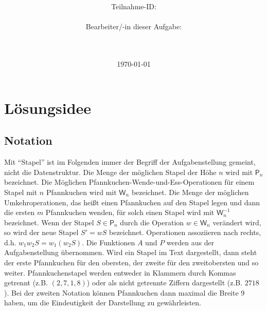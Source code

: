 \documentclass[a4paper,10pt,ngerman]{scrartcl}
\title{\textbf{\Huge\Aufgabe}}
\author{\LARGE Teilnahme-ID: \LARGE \TeilnahmeId \\\\
  \LARGE Bearbeiter/-in dieser Aufgabe: \\
  \LARGE \Name\\\\}
\date{\LARGE\today}
\begin{document}
\maketitle
\tableofcontents

\vspace{0.5cm}

\section{Lösungsidee}
\subsection{Notation}
Mit ``Stapel'' ist im Folgenden immer der Begriff der Aufgabenstellung gemeint,
nicht die Datenstruktur. Die Menge der möglichen Stapel der Höhe $n$ wird mit
$\mathsf{P}_n$ bezeichnet. Die Möglichen Pfannkuchen-Wende-und-Ess-Operationen
für einem Stapel mit $n$ Pfannkuchen wird mit $\mathsf{W}_n$ bezeichnet. Die
Menge der möglichen Umkehroperationen, das heißt einen Pfannkuchen auf den
Stapel legen und dann die ersten $m$ Pfannkuchen wenden, für solch einen Stapel
wird mit $\mathsf{W}^{-1}_n$ bezeichnet. Wenn der Stapel $S \in \mathsf{P}_n$
durch die Operation $w \in \mathsf{W}_n$ verändert wird, so wird der neue
Stapel $S' = w S$ bezeichnet. Operationen assoziieren nach rechts, d.h. $w_1
  w_2 S = w_1 (w_2 S)$. Die Funktionen $A$ und $P$ werden aus der
Aufgabenstellung übernommen. Wird ein Stapel im Text dargestellt, dann steht
der erste Pfannkuchen für den obersten, der zweite für den zweitobersten und so
weiter. Pfannkuchenstapel werden entweder in Klammern durch Kommas getrennt
(z.B. $(2,7,1,8)$) oder als nicht getrennte Ziffern dargestellt (z.B. $2718$).
Bei der zweiten Notation können Pfannkuchen dann maximal die Breite 9 haben, um
die Eindeutigkeit der Darstellung zu gewährleisten.
\end{document}

